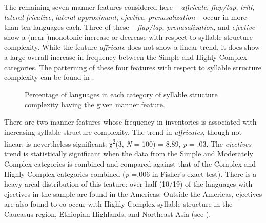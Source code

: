   The remaining seven manner features considered here -- \textit{affricate}, \textit{flap/tap}, \textit{trill}, \textit{lateral fricative}, \textit{lateral approximant}, \textit{ejective}, \textit{prenasalization} -- occur in more than ten languages each. Three of these --  \textit{flap/tap}, \textit{prenasalization}, and \textit{ejective} -- show a (near-)monotonic increase or decrease with respect to syllable structure complexity. While the feature \textit{affricate} does not show a linear trend, it does show a large overall increase in frequency between the Simple and Highly Complex categories. The patterning of these four features with respect to syllable structure complexity can be found in .

\begin{figure}
\caption{\label{fig:4.13}Percentage of languages in each category of syllable structure complexity having the given manner feature.}
\end{figure}

  There are two manner features whose frequency in inventories is associated with increasing syllable structure complexity. The trend in \textit{affricates}, though not linear, is nevertheless significant: χ\textsuperscript{2}(3, \textit{N} = 100) = 8.89, \textit{p} = .03. The \textit{ejectives} trend is statistically significant when the data from the Simple and Moderately Complex categories is combined and compared against that of the Complex and Highly Complex categories combined (\textit{p} =.006 in Fisher’s exact test). There is a heavy areal distribution of this feature: over half (10/19) of the languages with ejectives in the sample are found in the Americas. Outside the Americas, ejectives are also found to co-occur with Highly Complex syllable structure in the Caucasus region, Ethiopian Highlands, and Northeast Asia (see ).



